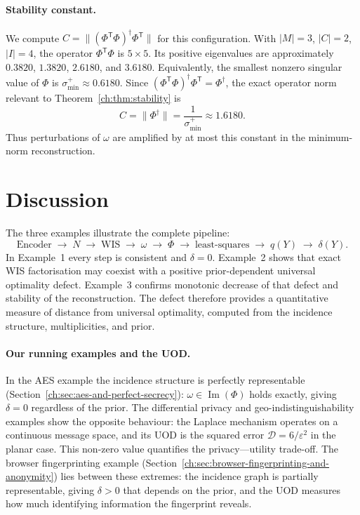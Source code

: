 \paragraph{Stability constant.}
We compute $C=\|(\Phi^{\mathsf T}\Phi)^\dagger\Phi^{\mathsf T}\|$ for
this configuration.  With $|M|=3$, $|C|=2$, $|I|=4$, the operator
$\Phi^{\mathsf T}\Phi$ is $5\times5$.  Its positive eigenvalues are
approximately $0.3820$, $1.3820$, $2.6180$, and $3.6180$.
Equivalently, the smallest nonzero singular value of $\Phi$ is
$\sigma_{\min}^+\approx0.6180$.  Since
$(\Phi^{\mathsf T}\Phi)^\dagger\Phi^{\mathsf T}=\Phi^\dagger$, the
exact operator norm relevant to Theorem~\ref{ch:thm:stability} is
\[
C=\|\Phi^\dagger\|=\frac{1}{\sigma_{\min}^+}
\approx 1.6180.
\]
Thus perturbations of $\omega$ are amplified by at most this constant
in the minimum-norm reconstruction.
\section{Discussion}\label{ch:sec:discussion-hilbert_geometry}
The three examples illustrate the complete pipeline:
\[
\text{Encoder}\;\to\; N \;\to\; \text{WIS}
\;\to\; \omega \;\to\; \Phi
\;\to\; \text{least-squares}
\;\to\; q(Y) \;\to\; \delta(Y).
\]
In Example~1 every step is consistent and $\delta=0$.  Example~2 shows
that exact WIS factorisation may coexist with a positive
prior-dependent universal optimality defect.  Example~3 confirms
monotonic decrease of that defect and stability of the reconstruction.
The defect therefore provides a quantitative measure of distance from
universal optimality, computed from the incidence structure,
multiplicities, and prior.

\paragraph{Our running examples and the UOD.}
In the AES example the incidence structure is perfectly representable (Section~\ref{ch:sec:aes-and-perfect-secrecy}): $\omega\in\operatorname{Im}(\Phi)$ holds exactly, giving $\delta=0$ regardless of the prior.  The differential privacy and geo-indistinguishability examples show the opposite behaviour: the Laplace mechanism operates on a continuous message space, and its UOD is the squared error $\mathcal D=6/\varepsilon^2$ in the planar case.  This non-zero value quantifies the privacy---utility trade-off.  The browser fingerprinting example (Section~\ref{ch:sec:browser-fingerprinting-and-anonymity}) lies between these extremes: the incidence graph is partially representable, giving $\delta>0$ that depends on the prior, and the UOD measures how much identifying information the fingerprint reveals.
\endinput
